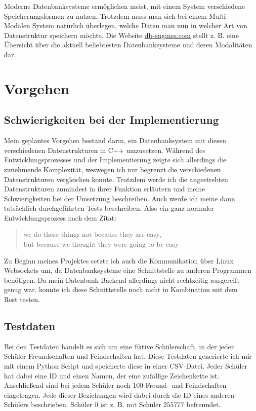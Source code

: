 \documentclass[11pt,a4paper]{article}
\begin{document}
Moderne Datenbanksysteme ermöglichen meist, mit einem System verschiedene
Speicherungsformen zu nutzen. Trotzdem muss man sich bei einem Multi-Modalen System
natürlich überlegen, welche Daten man nun in welcher Art von Datenstruktur speichern
möchte. Die Website \href{https://db-engines.com/en/ranking}{db-engines.com} stellt z. B.
eine Übersicht über die aktuell beliebtesten Datenbanksysteme und deren Modalitäten dar.

\section{Vorgehen}

\subsection{Schwierigkeiten bei der Implementierung}

Mein geplantes Vorgehen bestand darin, ein Datenbanksystem mit diesen
verschiedenen Datenstrukturen in C++ umzusetzen.
Während des Entwicklungsprozesses und der Implementierung zeigte sich allerdings die
zunehmende Komplexität, weswegen ich nur begrenzt die verschiedenen Datenstrukturen
vergleichen konnte. Trotzdem werde ich die angestrebten Datenstrukturen
zumindest in ihrer Funktion erläutern und meine Schwierigkeiten bei der Umsetzung
beschreiben.
Auch werde ich meine dann tatsächlich durchgeführten Tests beschreiben.
Also ein ganz normaler Entwicklungsprozess nach dem Zitat:

\begin{quote}
    \guillemetright we do these things not because they are easy, \\
    \hspace*{0.2em} but because we thought they were going to be easy\guillemetleft
\end{quote}

Zu Beginn meines Projektes setzte ich auch
die Kommunikation über Linux Websockets um, da Datenbanksysteme
eine Schnittstelle zu anderen Programmen benötigen.
Da mein Datenbank-Backend allerdings nicht rechtzeitig ausgereift genug war, konnte
ich diese Schnittstelle noch nicht in Kombination mit dem Rest testen.

\subsection{Testdaten}

Bei den Testdaten handelt es sich um eine fiktive Schülerschaft, in der jeder
Schüler Freundschaften und Feindschaften hat. Diese Testdaten generierte ich mir
mit einem Python Script und speicherte diese in einer CSV-Datei.
Jeder Schüler hat dabei eine ID und einen Namen, der eine zufällige Zeichenkette ist.
Anschließend sind bei jedem Schüler noch 100 Freund- und Feindschaften eingetragen.
Jede dieser Beziehungen wird dabei durch die ID eines anderen Schülers beschrieben.
Schüler $0$ ist z. B. mit Schüler $255777$ befreundet.
\end{document}
